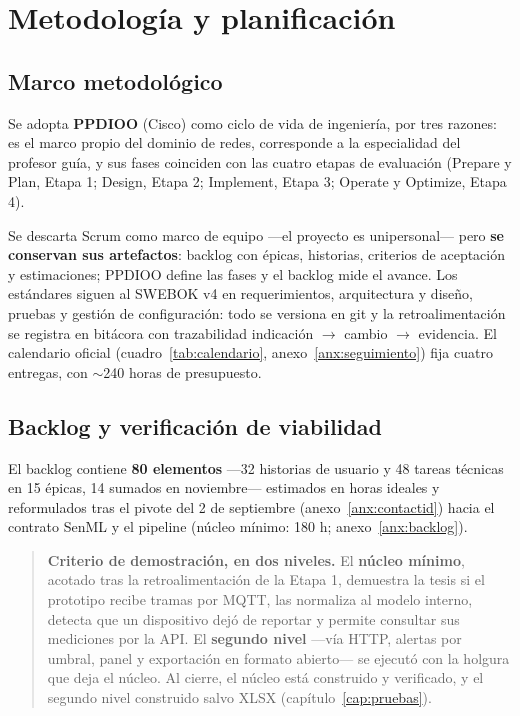 \chapter[Metodología y planificación]{Metodología y planificación}
\label{cap:metodologia}

\section{Marco metodológico}

Se adopta \textbf{PPDIOO} (Cisco) como ciclo de vida de ingeniería, por tres razones: es el marco propio
del dominio de redes, corresponde a la especialidad del profesor guía, y sus fases coinciden con las
cuatro etapas de evaluación (Prepare y Plan, Etapa 1; Design, Etapa 2; Implement, Etapa 3; Operate y Optimize, Etapa 4).

Se descarta Scrum como marco de equipo —el proyecto es unipersonal— pero \textbf{se conservan sus
artefactos}: backlog con épicas, historias, criterios de aceptación y estimaciones; PPDIOO define las fases y el backlog mide el avance. Los estándares siguen al SWEBOK v4 \parencite{swebok} en requerimientos, arquitectura y diseño,
pruebas y gestión de configuración: todo se versiona en git y la retroalimentación se registra en bitácora con trazabilidad indicación $\rightarrow$ cambio $\rightarrow$ evidencia. El
calendario oficial (cuadro~\ref{tab:calendario}, anexo~\ref{anx:seguimiento}) fija cuatro entregas, con $\sim$240 horas de presupuesto.

\section{Backlog y verificación de viabilidad}
\label{sec:backlog}

El backlog contiene \textbf{80 elementos} —32 historias de usuario y 48 tareas técnicas en 15 épicas, 14 sumados en noviembre—
estimados en horas ideales y reformulados tras el pivote del 2 de septiembre (anexo~\ref{anx:contactid}) hacia el contrato SenML y
el pipeline (núcleo mínimo: 180 h; anexo~\ref{anx:backlog}).

\begin{quote}
\textbf{Criterio de demostración, en dos niveles.} El \textbf{núcleo mínimo}, acotado tras la retroalimentación de la Etapa 1, demuestra la tesis si el prototipo recibe
tramas por MQTT, las normaliza al modelo interno, detecta que un dispositivo dejó de reportar y
permite consultar sus mediciones por la API. El \textbf{segundo nivel} —vía HTTP, alertas por umbral, panel y exportación en formato abierto— se ejecutó con la holgura que deja el núcleo. Al cierre, el núcleo está construido y verificado, y el segundo nivel construido salvo XLSX (capítulo~\ref{cap:pruebas}).
\end{quote}

